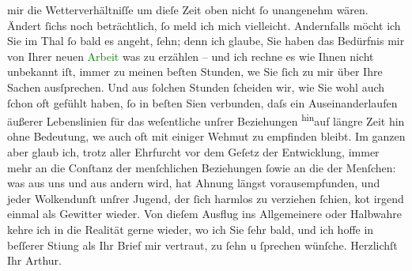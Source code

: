                mir die Wetterverhältniſſe um dieſe Zeit oben nicht ſo unangenehm wären. Ändert ſichs
               noch beträchtlich, ſo meld ich mich vielleicht. Andernfalls möcht ich Sie im Thal ſo
               bald es angeht, ſehn; denn ich glaube, {\pb}Sie haben das
               Bedürfnis mir von Ihrer neuen \textcolor{green}{Arbeit}{} was zu erzählen – und ich rechne es wie Ihnen nicht unbekannt iſt,
               immer zu meinen beſten Stunden, we{\geminationn} Sie ſich zu mir über
               Ihre Sachen ausſprechen. Und aus ſolchen Stunden ſcheiden wir, wie Sie wohl auch
               ſchon oft gefühlt haben, ſo in beſten Si{\geminationn}en verbunden,
               daſs ein Auseinanderlaufen äußerer Lebenslinien für das weſentliche unſrer
               Beziehungen \substVorne{}\textsuperscript{hin}\substDazwischen{}auf\substHinten{} längre Zeit \introOben{}hin\introOben{} ohne Bedeutung, we{\geminationn} auch oft mit einiger Wehmut zu empfinden bleibt. Im
               ganzen aber glaub ich, trotz aller Ehrfurcht vor dem Geſetz der Entwicklung, immer
               mehr an die Conſtanz der \introOben{}menſchlichen\introOben{} Beziehungen \introOben{}ſo\introOben{}wie an die der Menſchen: was aus uns und aus andern wird,
               hat Ahnung längst vorausempfunden, und jeder Wolkendunſt unſrer Jugend, der ſich
               harmlos zu verziehen ſchien, ko{\geminationm}t irgend einmal als
               Gewitter wieder. Von dieſem Ausflug ins Allgemeinere oder Halbwahre kehre ich in die
               Realität gerne wieder, wo ich Sie ſehr bald, und ich hoffe in beſſerer Sti{\geminationm}ung als Ihr Brief mir vertraut, zu ſehn u ſprechen
               wünſche.\pend
           \pstart Herzlichſt Ihr \spacefill\mbox{Arthur.}\pend{}\endnumbering{}  
      